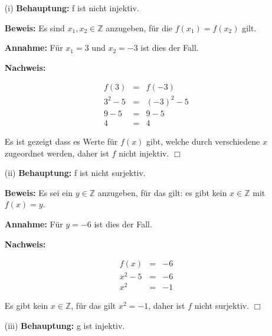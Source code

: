 \documentclass[a4paper]{scrartcl}
\begin{document}
\begin{enumerate}
        \begin{enumerate}
            \item[(i)]
                \textbf{Behauptung:} f ist nicht injektiv.
                
                \textbf{Beweis:} Es sind $x_1, x_2 \in \mathbb{Z}$ anzugeben, für die $f(x_1) = f(x_2)$ gilt.
                
                \textbf{Annahme:} Für $x_1 = 3$ und $x_2 = -3$ ist dies der Fall.
                
                \textbf{Nachweis:}
                
                $$\begin{array}{rcl}
                    f(3) &=& f(-3)\\
                    3^2 - 5 &=& (-3)^2 - 5\\
                    9 - 5 &=& 9 - 5\\
                    4 &=& 4
                \end{array}$$
                
                Es ist gezeigt dass es Werte für $f(x)$ gibt, welche durch verschiedene $x$ zugeordnet werden, daher
                ist $f$ nicht injektiv. $\Box$

            \item[(ii)]
                \textbf{Behauptung:} f ist nicht surjektiv.
                
                \textbf{Beweis:} Es sei ein $y \in \mathbb{Z}$ anzugeben, für das gilt: es gibt kein $x \in \mathbb{Z}$ mit
                $f(x) = y$.
                
                \textbf{Annahme:} Für $y = -6$ ist dies der Fall.
                
                \textbf{Nachweis:}
                
                $$\begin{array}{rcl}
                    f(x) &=& -6\\
                    x^2 - 5 &=& -6\\
                    x^2 &=& -1
                \end{array}$$
                
                Es gibt kein $x \in \mathbb{Z}$, für das gilt $x^2 = -1$, daher ist $f$ nicht surjektiv. $\Box$
            
            \item[(iii)]
                \textbf{Behauptung:} g ist injektiv.
                

\end{enumerate}
\end{enumerate}
\end{document}

